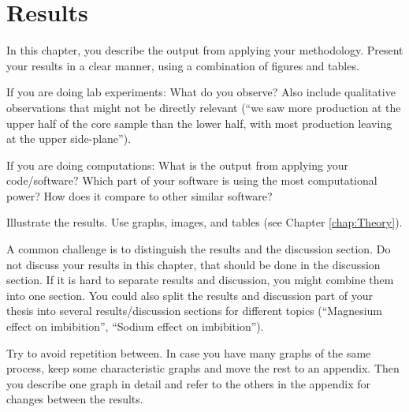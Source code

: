 \chapter{Results}
\label{chap:Results}

In this chapter, you describe the output from applying your methodology. Present your results in a clear manner, using a combination of figures and tables.

If you are doing lab experiments: What do you observe? Also include qualitative observations that might not be directly relevant (“we saw more production at the upper half of the core sample than the lower half, with most production leaving at the upper side-plane”).

If you are doing computations: What is the output from applying your code/software? Which part of your software is using the most computational power? How does it compare to other similar software?

Illustrate the results. Use graphs, images, and tables (see Chapter \ref{chap:Theory}).

A common challenge is to distinguish the results and the discussion section. Do not discuss your results in this chapter, that should be done in the discussion section. If it is hard to separate results and discussion, you might combine them into one section. You could also split the results and discussion part of your thesis into several results/discussion sections for different topics (“Magnesium effect on imbibition”, “Sodium effect on imbibition”).

Try to avoid repetition between. In case you have many graphs of the same process, keep some characteristic graphs and move the rest to an appendix. Then you describe one graph in detail and refer to the others in the appendix for changes between the results.